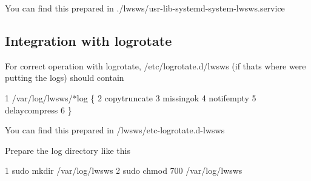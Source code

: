 You can find this prepared in {\ttfamily ./lwsws/usr-\/lib-\/systemd-\/system-\/lwsws.service}

\subsection*{Integration with logrotate }

For correct operation with logrotate, {\ttfamily /etc/logrotate.d/lwsws} (if that\textquotesingle{}s where we\textquotesingle{}re putting the logs) should contain 
\begin{DoxyCode}
1 /var/log/lwsws/*log \{
2     copytruncate
3     missingok
4     notifempty
5     delaycompress
6 \}
\end{DoxyCode}
 You can find this prepared in {\ttfamily /lwsws/etc-\/logrotate.d-\/lwsws}

Prepare the log directory like this


\begin{DoxyCode}
1 sudo mkdir /var/log/lwsws
2 sudo chmod 700 /var/log/lwsws
\end{DoxyCode}
 